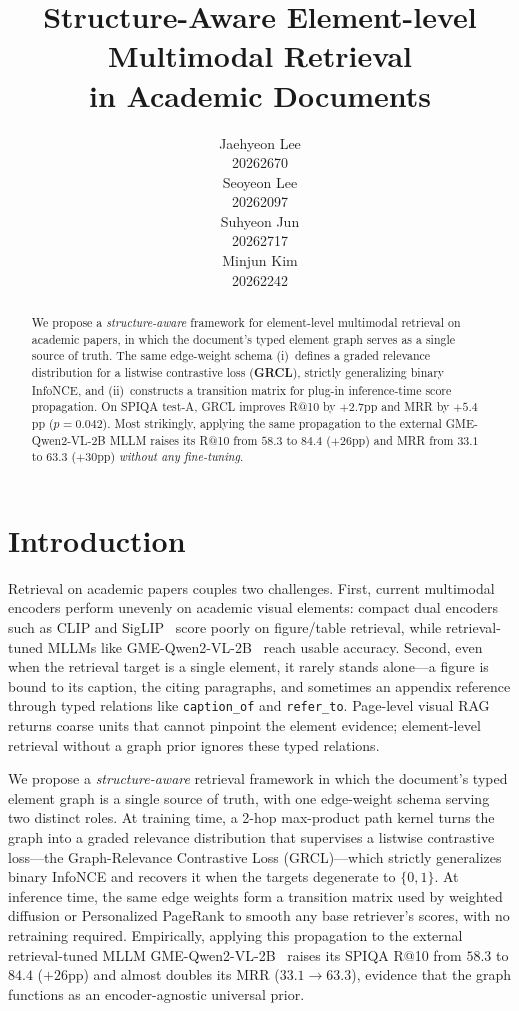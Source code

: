 \documentclass{article}
\title{Structure-Aware Element-level Multimodal Retrieval\\in Academic Documents}
\author{%
    Jaehyeon Lee \\
    20262670\\
    \And
    Seoyeon Lee \\
    20262097\\
    \And
    Suhyeon Jun \\
    20262717\\
    \And
    Minjun Kim \\
    20262242
}
\begin{document}
\maketitle

\begin{abstract}
We propose a \emph{structure-aware} framework for element-level
multimodal retrieval on academic papers, in which the document's
typed element graph serves as a single source of truth. The same
edge-weight schema (i)~defines a graded relevance distribution for a
listwise contrastive loss (\textbf{GRCL}), strictly generalizing binary
InfoNCE, and (ii)~constructs a transition matrix for plug-in
inference-time score propagation. On SPIQA test-A, GRCL improves R@10
by $+2.7$pp and MRR by $+5.4$pp ($p\!=\!0.042$). Most strikingly,
applying the same propagation to the external GME-Qwen2-VL-2B MLLM
raises its R@10 from $58.3$ to $\mathbf{84.4}$ ($+26$pp) and MRR from
$33.1$ to $\mathbf{63.3}$ ($+30$pp) \emph{without any fine-tuning}.
\end{abstract}


\section{Introduction}

Retrieval on academic papers couples two challenges. First, current
multimodal encoders perform unevenly on academic visual elements:
compact dual encoders such as CLIP and SigLIP~\cite{siglip2} score
poorly on figure/table retrieval, while retrieval-tuned MLLMs like
GME-Qwen2-VL-2B~\cite{gme} reach usable accuracy. Second, even when the
retrieval target is a single element, it rarely stands alone---a figure
is bound to its caption, the citing paragraphs, and sometimes an
appendix reference through typed relations like \texttt{caption\_of}
and \texttt{refer\_to}. Page-level visual RAG~\cite{colpali,visrag}
returns coarse units that cannot pinpoint the element evidence;
element-level retrieval without a graph prior ignores these typed
relations.

We propose a \emph{structure-aware} retrieval framework in which the
document's typed element graph is a single source of truth, with one
edge-weight schema serving two distinct roles. At training time, a 2-hop max-product path kernel turns the graph
into a graded relevance distribution that supervises a listwise
contrastive loss---the Graph-Relevance Contrastive Loss (GRCL)---which
strictly generalizes binary InfoNCE and recovers it when the targets
degenerate to $\{0,1\}$. At inference time, the same edge weights form a
transition matrix used by weighted diffusion or Personalized PageRank to
smooth any base retriever's scores, with no retraining required.
Empirically, applying this propagation to the external retrieval-tuned
MLLM GME-Qwen2-VL-2B~\cite{gme} raises its SPIQA R@10 from $58.3$ to
$84.4$ ($+26$pp) and almost doubles its MRR ($33.1\!\to\!63.3$), evidence
that the graph functions as an encoder-agnostic universal prior.
\end{document}
